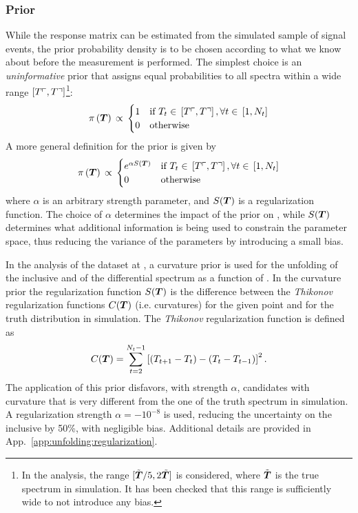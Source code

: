 \subsubsection{Prior}
\label{sec:fbuprior}
While the response matrix can be estimated from the simulated
sample of signal events, the prior probability density \prior{} is to
be chosen according to what we know about \Truth{} before the
measurement is performed.
The simplest choice is an {\it uninformative}
prior that assigns equal probabilities to all \Truth{} spectra within
a wide range $\left[T\ulcorner{}{}, T\urcorner{}{}\right]$\footnote{In the analysis,
the range $[\tilde{\boldsymbol{T}{}}/5, 2\tilde{\boldsymbol{T}}]$ is considered, where
$\tilde{\boldsymbol{T}{}}$ is the true spectrum in simulation. It has been
checked that this range is sufficiently wide to not introduce any bias.}:
\begin{equation}
\pi{}\left(\boldsymbol{T}{}\right){}
\propto{}
\begin{cases}
1 & \text{if }
T_{t}\in{}\left[T\ulcorner{}{}, T\urcorner{}{}\right], \forall{}t\in{}\left[1, N_t\right] \\
0 & \text{otherwise} \\
\end{cases}
\end{equation}
A more general definition for the prior is given by 
\begin{equation}
\pi{}\left(\boldsymbol{T}{}\right){}
\propto{}
\begin{cases}
e^{\alpha{}S(\boldsymbol{T}{})} & \text{if }
T_{t}\in{}\left[T\ulcorner{}{}, T\urcorner{}{}\right], \forall{}t\in{}\left[1, N_t\right] \\
0 & \text{otherwise} \\
\end{cases}
\end{equation}
where $\alpha{}$ is an arbitrary strength parameter, and
$S(\boldsymbol{T}{})$ is a regularization function.
The choice of $\alpha$ determines the impact of the prior on
\conditionalProb{\Truth{}}{\Data{}}, while $S(\boldsymbol{T}{})$ determines
what additional information is being used to constrain the parameter
space, thus reducing the variance of the \Truth{} parameters by
introducing a small bias.

In the analysis of the dataset at \seventev{}, a curvature prior is
used for the unfolding of the inclusive \ac{} and of the
differential \ac{} spectrum as a function of \pttt{}.
In the curvature prior the regularization function $S(\boldsymbol{T}{})$ is
the difference between the \emph{Thikonov} regularization functions
$C(\boldsymbol{T})$ (i.e. curvatures) for the given point \Truth{} and for the
truth distribution in simulation. 
The \emph{Thikonov} regularization function is defined as
\begin{equation}
        C(\boldsymbol{T}{}) =
        \sum_{t=2}^{N_t-1}\left[(T_{t+1}-T_{t})-(T_t-T_{t-1})\right]^2.
\end{equation}
The application of this prior disfavors, with strength $\alpha{}$,
\Truth{} candidates with curvature that is very different from
the one of the truth spectrum in simulation.
A regularization strength $\alpha{}=-10^{-8}$ is used, reducing the
uncertainty on the inclusive \ac{} by 50\%, with negligible
bias. Additional details are provided in
App.~\ref{app:unfolding:regularization}.


